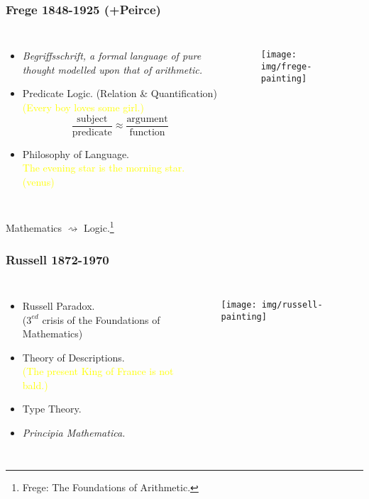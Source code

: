 \documentclass[UTF8,11pt,colorlinks,compress,openany]{beamer}%
\begin{document}
\begin{frame}\frametitle{Frege 1848-1925 (+Peirce)}
	\begin{columns}
			\begin{itemize}
				\item \emph{Begriffsschrift, a formal language of pure thought modelled upon that of arithmetic.}
				\item Predicate Logic. (Relation \& Quantification)\\
				\textcolor{yellow}{(Every boy loves some girl.)}
				\[\dfrac{\text{subject}}{\text{predicate}} \approx \dfrac{\text{argument}}{\text{function}}\]
				\item Philosophy of Language.\\
				\textcolor{yellow}{The evening star is the morning star. (venus)}
			\end{itemize}
			\begin{figure}
				\texttt{[image: img/frege-painting]}
			\end{figure}
	\end{columns}
	\centerline{\textcolor{red}{} Mathematics $\rightsquigarrow$ Logic.\footnote{\tiny Frege: The Foundations of Arithmetic.}}
\end{frame}

\begin{frame}\frametitle{Russell 1872-1970}
	\begin{columns}
		\column{0.63\textwidth}
			\begin{itemize}
				\item Russell Paradox.\\
				\small{($3^{ed}$ crisis of the Foundations of Mathematics)}
				\item Theory of Descriptions.\\
				\small{\textcolor{yellow}{(The present King of France is not bald.)}}
				\item Type Theory.
				\item \emph{Principia Mathematica.}
			\end{itemize}
		\column{0.16\textwidth}
			\begin{figure}[htbp]
				\texttt{[image: img/russell-painting]}
			\end{figure}
	\end{columns}
\begin{center}
\end{center}
\end{frame}
\end{document}
